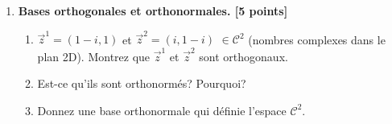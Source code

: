 \documentclass{article}
\begin{document}
\begin{enumerate}
\item {\bf Bases orthogonales et orthonormales. [5 points]} 
  \begin{enumerate}
    \item 
      $\overrightarrow{z}^1 = (1 - i, 1)$ et
      $\overrightarrow{z}^2 = (i, 1-i)$ $\in \mathcal{C}^2$ 
      (nombres complexes dans le
      plan 2D). Montrez que $\overrightarrow{z}^1$ et $\overrightarrow{z}^2$
      sont orthogonaux. 

  \item Est-ce qu'ils sont orthonormés? Pourquoi?
    
  \item Donnez une base orthonormale qui définie  l'espace
    $\mathcal{C}^2$.

  \end{enumerate}


\end{enumerate}
\end{document}
